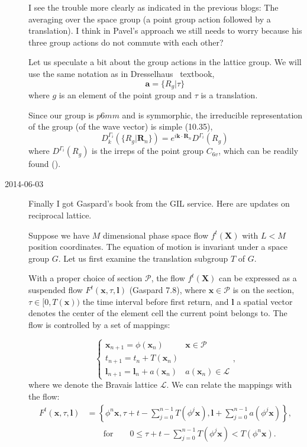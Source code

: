 \begin{description}
I see the trouble more clearly as indicated in the previous blogs: The
averaging over the space group (a point group action followed by a
translation). I think in Pavel's approach we still needs to worry
because his three group actions do not commute with each other?

Let us speculate a bit about the group actions in the lattice group. We
will use the same notation as in Dresselhaus \etal\
textbook,
\[
	\mathbf{a} = \{R_g\vert\tau\}
\,
\]
where $g$ is an element of the point group and $\tau$ is a translation.


Since our group is $p6mm$ and is symmorphic, the irreducible representation
of the group (of the wave vector) is simple (10.35),
\[
D_{k}^{\Gamma_{i}}(\{R_{g}\vert\mathbf{R}_{n}\})=e^{i\mathbf{k\cdot R}_{n}}D^{\Gamma_{i}}(R_{g})
\,
\]
where $D^{\Gamma_{i}}(R_{g})$ is the irreps of the point group $C_{6v}$,
which can be readily found (\HREF{http://www.cryst.ehu.es}{click here}).

\item[2014-06-03] Finally I got Gaspard's book from the GIL service. Here
are updates on reciprocal lattice.

Suppose we have $M$ dimensional phase space flow $f^{t}(\mathbf{X})$
with $L<M$ position coordinates. The equation of motion is invariant
under a space group $G$. Let us first examine the translation subgroup
$T$ of $G$.

With a proper choice of {\Poincare} section $\mathcal{P}$, the flow
$f^{t}(\mathbf{X})$ can be expressed as a suspended flow $F^{t}(\mathbf{x},\tau,\mathbf{l})$
(Gaspard 7.8), where $\mathbf{x}\in\mathcal{P}$ is on the section,
$\tau\in[0,T(\mathbf{x}))$ the time interval before first return,
and $\mathbf{l}$ a spatial vector denotes the center of the element
cell the current point belongs to. The flow is controlled by a set
of mappings:

\[
\begin{cases}
\mathbf{x}_{n+1}=\phi(\mathbf{x}_{n}) & \mathbf{x\in\mathcal{P}}\\
t_{n+1}=t_{n}+T(\mathbf{x}_{n})\\
\mathbf{l}_{n+1}=\mathbf{l}_{n}+a(\mathbf{x}_{n}) & a(\mathbf{x}_{n})\in\mathcal{L}
\end{cases},
\]
where we denote the Bravais lattice $\mathcal{L}$. We can relate
the mappings with the flow:
\begin{align*}
F^{t}(\mathbf{x},\tau,\mathbf{l}) & =\left\{ \phi^{n}\mathbf{x},\tau+t-\sum_{j=0}^{n-1}T(\phi^{j}\mathbf{x}),\mathbf{l}+\sum_{j=0}^{n-1}a(\phi^{j}\mathbf{x})\right\} ,\\
 & \qquad\mathrm{for}\qquad0\leq\tau+t-\sum_{j=0}^{n-1}T(\phi^{j}\mathbf{x})<T(\phi^{n}\mathbf{x}).
\end{align*}



\end{description}
